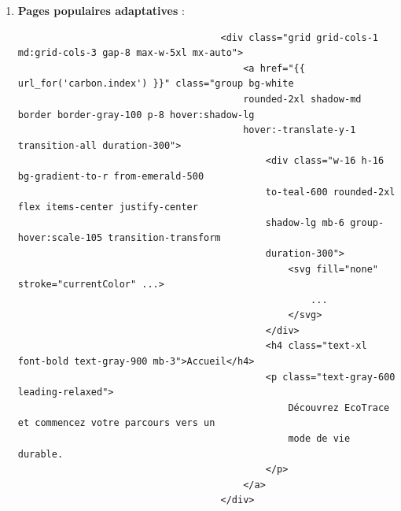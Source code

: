 \documentclass[a4paper,11pt]{article}
\begin{document}
\begin{enumerate}
                        \item \textbf{Pages populaires adaptatives} :
                            \begin{tcolorbox}[colback=lightgray!5, colframe=gray!80, left=-70mm, right=5mm, top=2mm, bottom=0mm, boxrule=0.1mm]
                                \begin{verbatim}
                                    <div class="grid grid-cols-1 md:grid-cols-3 gap-8 max-w-5xl mx-auto">
                                        <a href="{{ url_for('carbon.index') }}" class="group bg-white 
                                        rounded-2xl shadow-md border border-gray-100 p-8 hover:shadow-lg
                                        hover:-translate-y-1 transition-all duration-300">
                                            <div class="w-16 h-16 bg-gradient-to-r from-emerald-500 
                                            to-teal-600 rounded-2xl flex items-center justify-center 
                                            shadow-lg mb-6 group-hover:scale-105 transition-transform 
                                            duration-300">
                                                <svg fill="none" stroke="currentColor" ...>
                                                    ...
                                                </svg>
                                            </div>
                                            <h4 class="text-xl font-bold text-gray-900 mb-3">Accueil</h4>
                                            <p class="text-gray-600 leading-relaxed">
                                                Découvrez EcoTrace et commencez votre parcours vers un 
                                                mode de vie durable.
                                            </p>
                                        </a>
                                    </div>
                                \end{verbatim}
                            \end{tcolorbox}
                    \end{enumerate}
\end{document}
